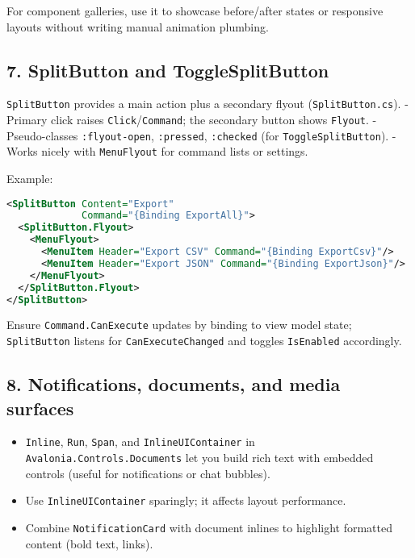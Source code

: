 For component galleries, use it to showcase before/after states or
responsive layouts without writing manual animation plumbing.

\subsection{7. SplitButton and
ToggleSplitButton}\label{splitbutton-and-togglesplitbutton}

\passthrough{\lstinline!SplitButton!} provides a main action plus a
secondary flyout (\passthrough{\lstinline!SplitButton.cs!}). - Primary
click raises
\passthrough{\lstinline!Click!}/\passthrough{\lstinline!Command!}; the
secondary button shows \passthrough{\lstinline!Flyout!}. -
Pseudo-classes \passthrough{\lstinline!:flyout-open!},
\passthrough{\lstinline!:pressed!}, \passthrough{\lstinline!:checked!}
(for \passthrough{\lstinline!ToggleSplitButton!}). - Works nicely with
\passthrough{\lstinline!MenuFlyout!} for command lists or settings.

Example:

\begin{lstlisting}[language=XML]
<SplitButton Content="Export"
             Command="{Binding ExportAll}">
  <SplitButton.Flyout>
    <MenuFlyout>
      <MenuItem Header="Export CSV" Command="{Binding ExportCsv}"/>
      <MenuItem Header="Export JSON" Command="{Binding ExportJson}"/>
    </MenuFlyout>
  </SplitButton.Flyout>
</SplitButton>
\end{lstlisting}

Ensure \passthrough{\lstinline!Command.CanExecute!} updates by binding
to view model state; \passthrough{\lstinline!SplitButton!} listens for
\passthrough{\lstinline!CanExecuteChanged!} and toggles
\passthrough{\lstinline!IsEnabled!} accordingly.

\subsection{8. Notifications, documents, and media
surfaces}\label{notifications-documents-and-media-surfaces}

\begin{itemize}
\tightlist
\item
  \passthrough{\lstinline!Inline!}, \passthrough{\lstinline!Run!},
  \passthrough{\lstinline!Span!}, and
  \passthrough{\lstinline!InlineUIContainer!} in
  \passthrough{\lstinline!Avalonia.Controls.Documents!} let you build
  rich text with embedded controls (useful for notifications or chat
  bubbles).
\item
  Use \passthrough{\lstinline!InlineUIContainer!} sparingly; it affects
  layout performance.
\item
  Combine \passthrough{\lstinline!NotificationCard!} with document
  inlines to highlight formatted content (bold text, links).
\end{itemize}


